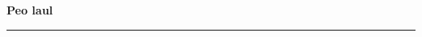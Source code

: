 \documentclass[10pt]{book}
\begin{document}
{
  \samepage
  \raggedbottom
  \raggedright
  \sloppy


  \vspace{0.2in}

  \noindent\begin{minipage}{.1\textwidth}
    \hfill\vspace{0.1in}
  \end{minipage}%
  \noindent\begin{minipage}{.8\textwidth}
    \centering
    \bfseries
    \large Peo laul
  \end{minipage}%
  \noindent\begin{minipage}{.1\textwidth}
      \hfill\vspace{0.1in}
  \end{minipage}

  \nopagebreak[4]
  \vspace{0.1in}
  \nopagebreak[4]
  \hrule height 0.05ex
  \nopagebreak[4]
  \vspace{-0.05in}




}
\end{document}
